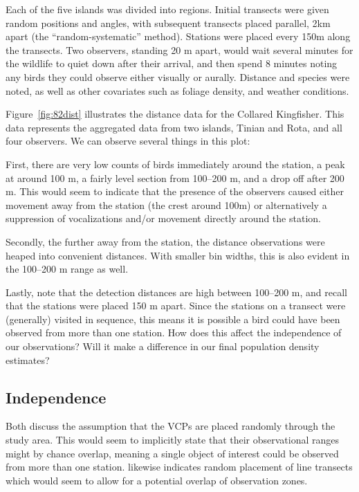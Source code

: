 \documentclass[12pt]{article}
\begin{document}
Each of the five islands was divided into regions. Initial transects were given random positions and angles, with subsequent transects placed parallel, 2km apart (the ``random-systematic'' method). Stations were placed every 150m along the transects. Two observers, standing 20 m apart, would wait several minutes for the wildlife to quiet down after their arrival, and then spend 8 minutes noting any birds they could observe either visually or aurally. Distance and species were noted, as well as other covariates such as foliage density, and weather conditions. 

Figure~\ref{fig:82dist} illustrates the distance data for the Collared Kingfisher. This data represents the aggregated data from two islands, Tinian and Rota, and all four observers. We can observe several things in this plot:

First, there are very low counts of birds immediately around the station, a peak at around 100 m, a fairly level section from 100--200 m, and a drop off after 200 m. This would seem to indicate that the presence of the observers caused either movement away from the station (the crest around 100m) or alternatively a suppression of vocalizations and/or movement directly around the station. 

Secondly, the further away from the station, the distance observations were heaped into convenient distances. With smaller bin widths, this is also evident in the 100--200 m range as well.

Lastly, note that the detection distances are high between 100--200 m, and recall that the stations were placed 150 m apart. Since the stations on a transect were (generally) visited in sequence, this means it is possible a bird could have been observed from more than one station. How does this affect the independence of our observations? Will it make a difference in our final population density estimates?

\subsection{Independence}
Both \textcite{ramsey1979,buckland1987} discuss the assumption that the VCPs are placed randomly through the study area. This would seem to implicitly state that their observational ranges might by chance overlap, meaning a single object of interest could be observed from more than one station.  \textcite[240]{thompson2012} likewise indicates random placement of line transects which would seem to allow for a potential overlap of observation zones. 
\end{document}
